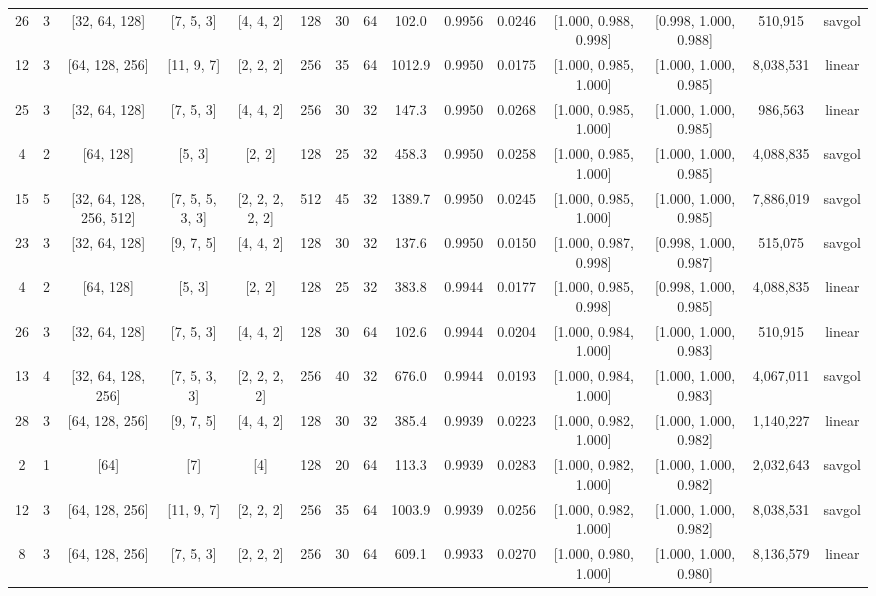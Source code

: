 \begin{table}[htbp]
\begin{tabular}{|c|c|c|c|c|c|c|c|c|c|c|c|c|c|c|}
26 & 3 & [32, 64, 128] & [7, 5, 3] & [4, 4, 2] & 128 & 30 & 64 & 102.0 & 0.9956 & 0.0246 & [1.000, 0.988, 0.998] & [0.998, 1.000, 0.988] & 510,915 & savgol \\
12 & 3 & [64, 128, 256] & [11, 9, 7] & [2, 2, 2] & 256 & 35 & 64 & 1012.9 & 0.9950 & 0.0175 & [1.000, 0.985, 1.000] & [1.000, 1.000, 0.985] & 8,038,531 & linear \\
25 & 3 & [32, 64, 128] & [7, 5, 3] & [4, 4, 2] & 256 & 30 & 32 & 147.3 & 0.9950 & 0.0268 & [1.000, 0.985, 1.000] & [1.000, 1.000, 0.985] & 986,563 & linear \\
4 & 2 & [64, 128] & [5, 3] & [2, 2] & 128 & 25 & 32 & 458.3 & 0.9950 & 0.0258 & [1.000, 0.985, 1.000] & [1.000, 1.000, 0.985] & 4,088,835 & savgol \\
15 & 5 & [32, 64, 128, 256, 512] & [7, 5, 5, 3, 3] & [2, 2, 2, 2, 2] & 512 & 45 & 32 & 1389.7 & 0.9950 & 0.0245 & [1.000, 0.985, 1.000] & [1.000, 1.000, 0.985] & 7,886,019 & savgol \\
23 & 3 & [32, 64, 128] & [9, 7, 5] & [4, 4, 2] & 128 & 30 & 32 & 137.6 & 0.9950 & 0.0150 & [1.000, 0.987, 0.998] & [0.998, 1.000, 0.987] & 515,075 & savgol \\
4 & 2 & [64, 128] & [5, 3] & [2, 2] & 128 & 25 & 32 & 383.8 & 0.9944 & 0.0177 & [1.000, 0.985, 0.998] & [0.998, 1.000, 0.985] & 4,088,835 & linear \\
26 & 3 & [32, 64, 128] & [7, 5, 3] & [4, 4, 2] & 128 & 30 & 64 & 102.6 & 0.9944 & 0.0204 & [1.000, 0.984, 1.000] & [1.000, 1.000, 0.983] & 510,915 & linear \\
13 & 4 & [32, 64, 128, 256] & [7, 5, 3, 3] & [2, 2, 2, 2] & 256 & 40 & 32 & 676.0 & 0.9944 & 0.0193 & [1.000, 0.984, 1.000] & [1.000, 1.000, 0.983] & 4,067,011 & savgol \\
28 & 3 & [64, 128, 256] & [9, 7, 5] & [4, 4, 2] & 128 & 30 & 32 & 385.4 & 0.9939 & 0.0223 & [1.000, 0.982, 1.000] & [1.000, 1.000, 0.982] & 1,140,227 & linear \\
2 & 1 & [64] & [7] & [4] & 128 & 20 & 64 & 113.3 & 0.9939 & 0.0283 & [1.000, 0.982, 1.000] & [1.000, 1.000, 0.982] & 2,032,643 & savgol \\
12 & 3 & [64, 128, 256] & [11, 9, 7] & [2, 2, 2] & 256 & 35 & 64 & 1003.9 & 0.9939 & 0.0256 & [1.000, 0.982, 1.000] & [1.000, 1.000, 0.982] & 8,038,531 & savgol \\
8 & 3 & [64, 128, 256] & [7, 5, 3] & [2, 2, 2] & 256 & 30 & 64 & 609.1 & 0.9933 & 0.0270 & [1.000, 0.980, 1.000] & [1.000, 1.000, 0.980] & 8,136,579 & linear \\

\end{tabular}
\end{table}
